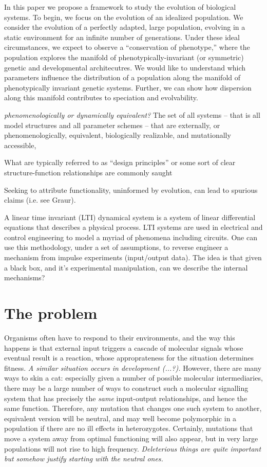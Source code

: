 \documentclass[11 pt]{article}
\newcommand{\plr}[1]{{\color{blue}\it #1}}
\begin{document}
In this paper we propose a framework to study the evolution of biological systems. To begin, we focus on the evolution of an idealized population. We consider the evolution of a perfectly adapted, large population, evolving in a static environment for an infinite number of generations. Under these ideal circumstances, we expect to observe a ``conservation of phenotype,'' where the population explores the manifold of phenotypically-invariant (or symmetric) genetic and developmental architecutres. We would like to understand which parameters influence the distribution of a population along the manifold of phenotypically invariant genetic systems. Further, we can show how dispersion along this manifold contributes to speciation and evolvability. 

\plr{phenomenologically or dynamically equivalent?}
The set of all systems -- that is all model structures and all parameter schemes -- that
are externally, or phenomenologically, equivalent, biologically realizable, and mutationally accessible, 

What are typically referred to as ``design principles'' or some sort of clear structure-function relationships are commonly saught 

Seeking to attribute functionality, uninformed by evolution, can lead to spurious claims
(i.e. see Graur).


A linear time invariant (LTI) dynamical system is a system of linear
differential equations that describes a physical process. 
LTI systems are used in electrical and control engineering to model a myriad of phenomena including
circuits. 
One can use this methodology, under a set of assumptions, to reverse engineer a
mechanism from impulse experiments (input/output data). The idea is that given
a black box, and it's experimental manipulation, can we describe the internal
mechanisms? 

\section{The problem}

Organisms often have to respond to their environments,
and the way this happens is that external input triggers a cascade of molecular signals
whose eventual result is a reaction,
whose approprateness for the situation determines fitness.
\plr{A similar situation occurs in development (...?).}
However, there are many ways to skin a cat:
especially given a number of possible molecular intermediaries,
there may be a large number of ways to construct such a molecular signalling system
that has precisely the \emph{same} input-output relationships,
and hence the same function.
Therefore, any mutation that changes one such system to another, equivalent version
will be neutral,
and may well become polymorphic in a population if there are no ill effects in heterozygotes.
Certainly, mutations that move a system away from optimal functioning will also appear,
but in very large populations will not rise to high frequency.
\plr{Deleterious things are quite important but somehow justify starting with the neutral ones.}
\end{document}
